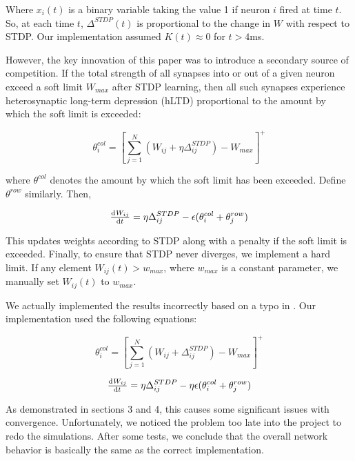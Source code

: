 Where \(x_i(t)\) is a binary variable taking the value 1 if neuron \(i\) fired at time \(t\). So, at each time \(t\), \(\Delta^{STDP}(t)\) is proportional to the change in \(W\) with respect to STDP. Our implementation assumed \(K(t) \approx 0\) for \(t > 4\)ms.

However, the key innovation of this paper was to introduce a secondary source of competition. If the total strength of all synapses into or out of a given neuron exceed a soft limit \(W_{max}\) after STDP learning, then all such synapses experience heterosynaptic long-term depression (hLTD) proportional to the amount by which the soft limit is exceeded:

\begin{equation}
\theta^{col}_i =  \left[\sum_{j=1}^N (W_{ij} + \eta\Delta^{STDP}_{ij}) - W_{max}\right]^+
\label{hLTD}
\end{equation}

\noindent where \(\theta^{col}\) denotes the amount by which the soft limit has been exceeded. Define \(\theta^{row}\) similarly. Then,

\begin{equation}
\od{W_{ij}}{t} = \eta\Delta^{STDP}_{ij} - \epsilon(\theta^{col}_i + \theta^{row}_j)
\label{Learning}
\end{equation}

This updates weights according to STDP along with a penalty if the soft limit is exceeded. Finally, to ensure that STDP never diverges, we implement a hard limit. If any element \(W_{ij}(t) > w_{max}\), where \(w_{max}\) is a constant parameter, we manually set \(W_{ij}(t)\) to \(w_{max}\). 

We actually implemented the results incorrectly based on a typo in \cite{Fiete}. Our implementation used the following equations:

\begin{equation}
\theta^{col}_i =  \left[\sum_{j=1}^N (W_{ij} + \Delta^{STDP}_{ij}) - W_{max}\right]^+
\label{hLTD-wrong}
\end{equation}

\begin{equation}
\od{W_{ij}}{t} = \eta\Delta^{STDP}_{ij} - \eta\epsilon(\theta^{col}_i + \theta^{row}_j)
\label{Learning-wrong}
\end{equation}

As demonstrated in sections 3 and 4, this causes some significant issues with convergence. Unfortunately, we noticed the problem too late into the project to redo the simulations. After some tests, we conclude that the overall network behavior is basically the same as the correct implementation.  

